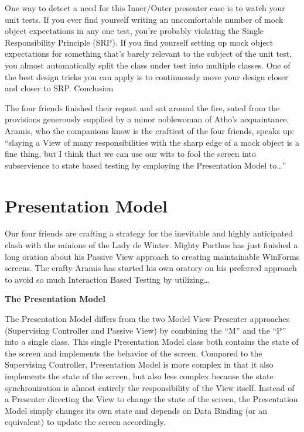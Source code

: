 \documentclass{article}
\begin{document}
{One way to detect a need for this Inner/Outer presenter case is to watch your unit tests.  If you ever find yourself writing an uncomfortable number of mock object expectations in any one test, you're probably violating the Single Responsibility Principle (SRP).  If you find yourself setting up mock object expectations for something that's barely relevant to the subject of the unit test, you almost automatically split the class under test into multiple classes.  One of the best design tricks you can apply is to continuously move your design closer and closer to SRP.
Conclusion

The four friends finished their repast and sat around the fire, sated from the provisions generously supplied by a minor noblewoman of Atho's acquaintance.  Aramis, who the companions know is the craftiest of the four friends, speaks up:  “slaying a View of many responsibilities with the sharp edge of a mock object is a fine thing, but I think that we can use our wits to fool the screen into  subservience to state based testing by employing the Presentation Model to…”

\section{ Presentation Model } 


Our four friends are crafting a strategy for the inevitable and highly anticipated clash with the minions of the Lady de Winter.  Mighty Porthos has just finished a long oration about his Passive View approach to creating maintainable WinForms screens.  The crafty Aramis has started his own oratory on his preferred approach to avoid so much Interaction Based Testing by utilizing…
 
\Large {\textbf{The Presentation Model}}

The Presentation Model differs from the two Model View Presenter approaches (Supervising Controller and Passive View) by combining the “M” and the “P” into a single class.  This single Presentation Model class both contains the state of the screen and implements the behavior of the screen.  Compared to the Supervising Controller, Presentation Model is more complex in that it also implements the state of the screen, but also less complex because the state synchronization is almost entirely the responsibility of the View itself.  Instead of a Presenter directing the View to change the state of the screen, the Presentation Model simply changes its own state and depends on Data Binding (or an equivalent) to update the screen accordingly. 

}
\end{document}
